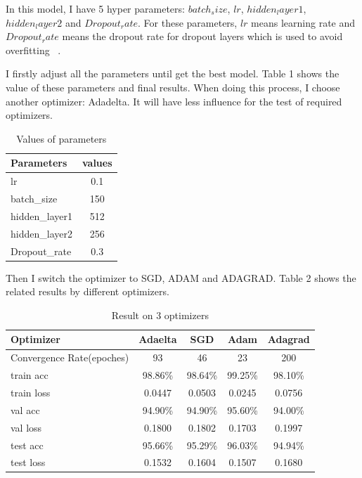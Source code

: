 \documentclass{article}
\begin{document}
In this model, I have 5 hyper parameters: $batch_size$, $lr$, $hidden_layer1$, $hidden_layer2$ and $Dropout_rate$. For these parameters, $lr$ means learning rate and $Dropout_rate$ means the dropout rate for dropout layers which is used to avoid overfitting~\cite{dropout} .


I firstly adjust all the parameters until get the best model. Table 1 shows the value of these parameters and final results. When doing this process, I choose another optimizer: Adadelta. It will have less influence for the test of required optimizers.

\begin{table}[ht]
    \caption{Values of parameters}
    \centering
    \begin{tabular}{|l|c|}
    \hline
         Parameters & values \\ \hline
         lr & 0.1 \\
         batch\_size & 150 \\
         hidden\_layer1 & 512  \\
         hidden\_layer2 & 256\\
         Dropout\_rate & 0.3 \\ \hline
    \end{tabular}
    \label{table1}
\end{table}

Then I switch the optimizer to SGD, ADAM and ADAGRAD. Table 2 shows the related results by different optimizers.

\begin{table}[ht]
    \caption{Result on 3 optimizers}
    \centering
    \begin{tabular}{|l|c|c|c|c|}
    \hline
         Optimizer  & Adaelta & SGD & Adam & Adagrad\\ \hline
         Convergence Rate(epoches) &  93 &46 & 23 &  200\\ \hline
         train acc & 98.86\% & 98.64\% & 99.25\% & 98.10\%\\
         train loss & 0.0447 & 0.0503 & 0.0245 & 0.0756\\ \hline
         val acc &  94.90\% & 94.90\% & 95.60\% & 94.00\% \\
         val loss & 0.1800 &0.1802 & 0.1703 & 0.1997 \\ \hline
         test acc & 95.66\% & 95.29\% & 96.03\% & 94.94\% \\
         test loss & 0.1532 & 0.1604 & 0.1507 &  0.1680\\ \hline
    \end{tabular}
    \label{table2}
\end{table}
\end{document}
